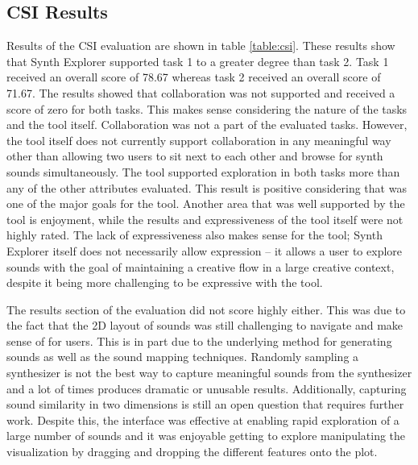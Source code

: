 \subsection{CSI Results}
Results of the CSI evaluation are shown in table \ref{table:csi}. These results show that Synth Explorer supported task 1 to a greater degree than task 2. Task 1 received an overall score of 78.67 whereas task 2 received an overall score of 71.67. The results showed that collaboration was not supported and received a score of zero for both tasks. This makes sense considering the nature of the tasks and the tool itself. Collaboration was not a part of the evaluated tasks. However, the tool itself does not currently support collaboration in any meaningful way other than allowing two users to sit next to each other and browse for synth sounds simultaneously. The tool supported exploration in both tasks more than any of the other attributes evaluated. This result is positive considering that was one of the major goals for the tool. Another area that was well supported by the tool is enjoyment, while the results and expressiveness of the tool itself were not highly rated. The lack of expressiveness also makes sense for the tool; Synth Explorer itself does not necessarily allow expression -- it allows a user to explore sounds with the goal of maintaining a creative flow in a large creative context, despite it being more challenging to be expressive with the tool.

The results section of the evaluation did not score highly either. This was due to the fact that the 2D layout of sounds was still challenging to navigate and make sense of for users. This is in part due to the underlying method for generating sounds as well as the sound mapping techniques. Randomly sampling a synthesizer is not the best way to capture meaningful sounds from the synthesizer and a lot of times produces dramatic or unusable results. Additionally, capturing sound similarity in two dimensions is still an open question that requires further work. Despite this, the interface was effective at enabling rapid exploration of a large number of sounds and it was enjoyable getting to explore manipulating the visualization by dragging and dropping the different features onto the plot.

